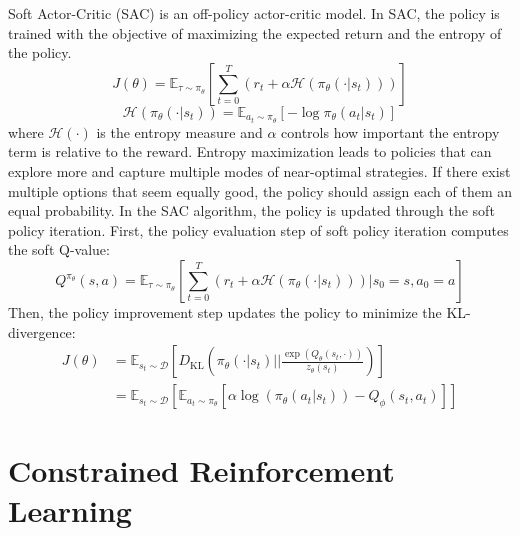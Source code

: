 Soft Actor-Critic (SAC) \cite{SAC1, SAC2, SAC3} is an off-policy actor-critic model.
In SAC, the policy is trained with the objective of maximizing the expected return and the entropy of the policy.
\begin{equation}
  J(\theta) = \mathbb{E}_{\tau \sim \pi_\theta} \left[ \sum^T_{t = 0} (r_t + \alpha \mathcal{H}(\pi_\theta(\cdot|s_t))) \right]
\end{equation}
\begin{equation}
  \mathcal{H}(\pi_\theta(\cdot|s_t)) = \mathbb{E}_{a_t \sim \pi_\theta}[-\log \pi_\theta(a_t|s_t)]
\end{equation}
where $\mathcal{H}(\cdot)$ is the entropy measure and $\alpha$ controls how important the entropy term is relative to the reward.
Entropy maximization leads to policies that can explore more and capture multiple modes of near-optimal strategies.
If there exist multiple options that seem equally good, the policy should assign each of them an equal probability.
In the SAC algorithm, the policy is updated through the soft policy iteration.
First, the policy evaluation step of soft policy iteration computes the soft Q-value:
\begin{equation}
  Q^{\pi_\theta}(s, a) = \mathbb{E}_{\tau \sim \pi_\theta} \left[ \sum^T_{t = 0} \left(r_t + \alpha \mathcal{H}(\pi_\theta(\cdot|s_t))\right) \Bigg| s_0 = s, a_0 = a \right]
\end{equation}
Then, the policy improvement step updates the policy to minimize the KL-divergence:
\begin{equation}
  \begin{aligned}
    J(\theta)
    &= \mathbb{E}_{s_t \sim \mathcal{D}} \left[ D_\text{KL} \left( \pi_\theta(\cdot|s_t) \Bigg|\Bigg| \frac{\exp(Q_\theta(s_t, \cdot))}{z_\theta(s_t)} \right) \right] \\
    &= \mathbb{E}_{s_t \sim \mathcal{D}} \left[ \mathbb{E}_{a_t \sim \pi_\theta} [\alpha \log (\pi_\theta(a_t|s_t)) - Q_\phi(s_t, a_t)] \right]
  \end{aligned}
\end{equation}

\section{Constrained Reinforcement Learning} \label{chap2:sec4}

